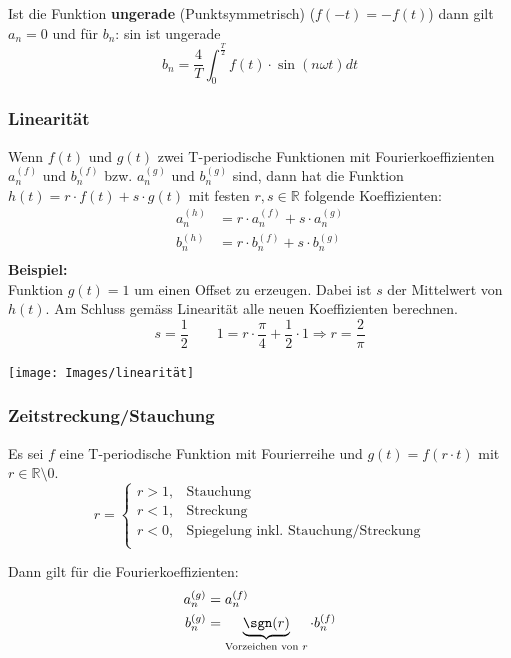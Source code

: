 \noindent Ist die Funktion \textbf{ungerade} (Punktsymmetrisch) ($f(-t) = -f(t)$) dann gilt $a_n = 0$ und für $b_n$: sin ist ungerade
\[
	b_n = \frac{4}{T}\int_{0}^{\frac{T}{2}}f(t) \cdot \sin(n\omega t)dt 
\]


\subsubsection{Linearität}
Wenn $f(t)$ und $g(t)$ zwei T-periodische Funktionen mit Fourierkoeffizienten $a_n^{(f)}$ und $b_n^{(f)}$ bzw.  $a_n^{(g)}$ und $b_n^{(g)}$ sind, dann hat die Funktion $h(t) = r \cdot f(t) + s \cdot g(t)$ mit festen $r,s \in \mathbb{R}$ folgende Koeffizienten:
\begin{align*}
	a_n^{(h)} &= r \cdot a_n^{(f)} + s \cdot a_n^{(g)} \\
	b_n^{(h)} &= r \cdot b_n^{(f)} + s \cdot b_n^{(g)} \\
\end{align*}
\noindent\textbf{Beispiel:}~\\
\noindent Funktion $g(t) = 1$ um einen Offset zu erzeugen. Dabei ist $s$ der Mittelwert von $h(t)$. Am Schluss gemäss Linearität alle neuen Koeffizienten berechnen.
\[
	s = \frac{1}{2} \qquad
	1 = r\cdot \frac{\pi}{4} + \frac{1}{2} \cdot 1 \Rightarrow r = \frac{2}{\pi}
\]
\begin{center}
	\texttt{[image: Images/linearität]}
\end{center}

\subsubsection{Zeitstreckung/Stauchung}
Es sei $f$ eine T-periodische Funktion mit Fourierreihe und $g(t) = f(r \cdot t)$ mit $r \in \mathbb{R}\setminus0$.
\[
r = \begin{cases}
		r > 1, & \text{Stauchung}\\
		r < 1, & \text{Streckung}\\
		r < 0, & \text{Spiegelung inkl. Stauchung/Streckung}\\
	\end{cases}
\]

\noindent Dann gilt für die Fourierkoeffizienten:
\begin{align*}
	a_n^{(g)} &= a_n^{(f)} \\
	b_n^{(g)} &= \underbrace{\sgn(r)}_{\text{Vorzeichen von } r} \cdot b_n^{(f)} \\
\end{align*}

